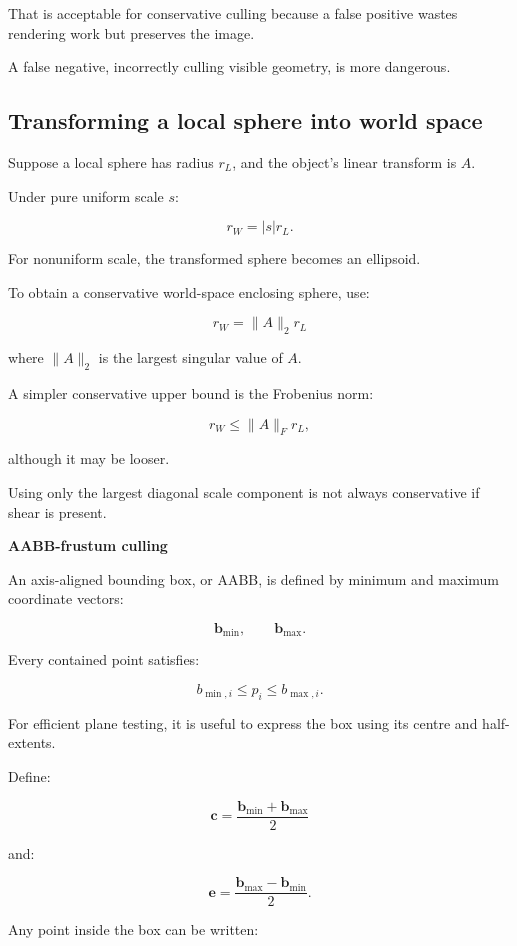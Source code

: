 That is acceptable for conservative culling because a false positive wastes rendering work but preserves the image.

A false negative, incorrectly culling visible geometry, is more dangerous.

\subsection{Transforming a local sphere into world space}\label{02-foundations-ii-ch034-transforming-a-local-sphere-into-world-space}

Suppose a local sphere has radius \(r_L\), and the object's linear transform is \(A\).

Under pure uniform scale \(s\):

\[
 r_W=|s|r_L.
\]

For nonuniform scale, the transformed sphere becomes an ellipsoid.

To obtain a conservative world-space enclosing sphere, use:

\[
 \boxed{ r_W=\|A\|_2r_L }
\]

where \(\|A\|_2\) is the largest singular value of \(A\).

A simpler conservative upper bound is the Frobenius norm:

\[
 r_W\le\|A\|_Fr_L,
\]

although it may be looser.

Using only the largest diagonal scale component is not always conservative if shear is present.

\textbf{AABB-frustum culling}

An axis-aligned bounding box, or AABB, is defined by minimum and maximum coordinate vectors:

\[
 \mathbf b_{\min}, \qquad \mathbf b_{\max}.
\]

Every contained point satisfies:

\[
 b_{\min,i}\le p_i\le b_{\max,i}.
\]

For efficient plane testing, it is useful to express the box using its centre and half-extents.

Define:

\[
 \boxed{ \mathbf c= \frac{\mathbf b_{\min}+\mathbf b_{\max}}2 }
\]

and:

\[
 \boxed{ \mathbf e= \frac{\mathbf b_{\max}-\mathbf b_{\min}}2 }.
\]

Any point inside the box can be written:

